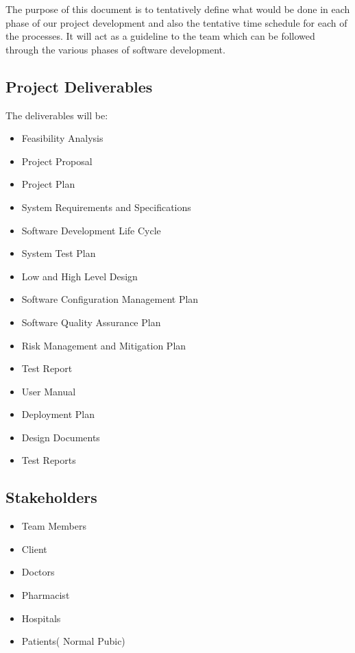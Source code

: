 \documentclass[
10pt, %
a4paper, %
oneside, %
headinclude,footinclude, %
BCOR5mm, %
]{scrartcl}
\begin{document}
The purpose of this document is to tentatively define what would be done in each phase of our project development and also the tentative time schedule for each of the processes. It will act as a guideline to the team which can be followed through the various phases of software development. 



\subsection{ Project Deliverables}

The deliverables will be:
\begin{itemize}
    

\item 	Feasibility Analysis
\item 	Project Proposal 
\item 	Project Plan
\item 	System Requirements and Specifications
\item 	Software Development Life Cycle

\item 	System Test Plan
\item 	Low and High Level Design
\item 	Software Configuration Management Plan
\item 	Software Quality Assurance Plan
\item 	Risk Management and Mitigation Plan

\item 	Test Report

\item 	User Manual

\item 	Deployment Plan



\item 	Design Documents
\item 	Test Reports

\end{itemize}
 



\subsection{ Stakeholders}
\begin{itemize}
    


\item Team Members
\item Client
\item Doctors
\item Pharmacist
\item Hospitals
\item Patients( Normal Pubic)

\end{itemize}
\end{document}
